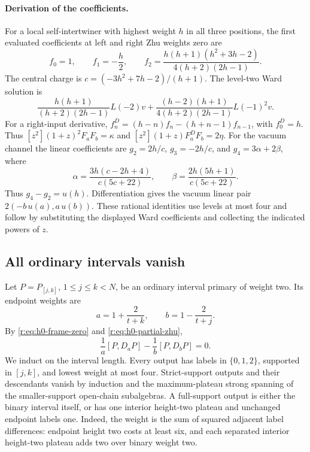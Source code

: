 \documentclass[11pt,a4paper]{article}
\numberwithin{equation}{section}
\theoremstyle{definition}\newtheorem{definition}[theorem]{Definition}
\theoremstyle{remark}\newtheorem{remark}[theorem]{Remark}
\begin{document}
\paragraph{Derivation of the coefficients.}
For a local self-intertwiner with highest weight $h$ in all three positions,
the first evaluated coefficients at left and right Zhu weights zero are
\[
 f_0=1,\qquad f_1=-\frac h2,\qquad
 f_2=\frac{h(h+1)(h^2+3h-2)}{4(h+2)(2h-1)}.
\]
The central charge is $c=(-3h^2+7h-2)/(h+1)$.  The level-two Ward solution is
\[
 \frac{h(h+1)}{(h+2)(2h-1)}L(-2)v
 +\frac{(h-2)(h+1)}{4(h+2)(2h-1)}L(-1)^2v.
\]
For a right-input derivative,
$f^D_n=(h-n)f_n-(h+n-1)f_{n-1}$, with $f^D_0=h$.
Thus $[z^2](1+z)^2F_aF_b=\kappa$ and
$[z^2](1+z)F^D_aF_b=2\eta$.
For the vacuum channel the linear coefficients are $g_2=2h/c$,
$g_3=-2h/c$, and $g_4=3\alpha+2\beta$, where
\[
 \alpha=\frac{3h(c-2h+4)}{c(5c+22)},\qquad
 \beta=\frac{2h(5h+1)}{c(5c+22)}.
\]
Thus $g_4-g_2=u(h)$.  Differentiation gives the vacuum linear pair
$2(-b\,u(a),a\,u(b))$.  These rational identities use
levels at most four and follow by substituting the displayed Ward
coefficients and collecting the indicated powers of $z$.

\subsection{All ordinary intervals vanish}

Let $P=P_{[j,k]}$, $1\leq j\leq k<N$, be an ordinary interval primary of
weight two.  Its endpoint weights are
\[
 a=1+\frac2{t+k},\qquad b=1-\frac2{t+j}.
\]
By \eqref{r:eq:h0-frame-zero} and \eqref{r:eq:h0-partial-zhu},
\begin{equation}
 \frac1a[P,D_aP]-\frac1b[P,D_bP]=0.
 \label{r:eq:h0-endpoint-difference}
\end{equation}
We induct on the interval length.  Every output has labels in
$\{0,1,2\}$, supported in $[j,k]$, and lowest weight at most four.
Strict-support outputs and their descendants vanish by induction and the
maximum-plateau strong spanning of the smaller-support open-chain
subalgebras.  A full-support output is either the binary interval itself,
or has one interior height-two plateau and unchanged endpoint labels one.
Indeed, the weight is the sum of squared adjacent label differences:
endpoint height two costs at least six, and each separated interior
height-two plateau adds two over binary weight two.
\end{document}
